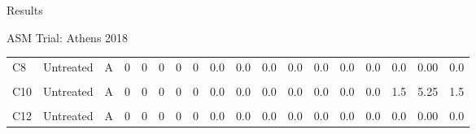 \documentclass[
  ignorenonframetext,
]{beamer}
\begin{document}
\begin{frame}{Results}
\begin{block}{ASM Trial: Athens 2018}
\begin{table}
{\begin{tabular}[t]{lllrrrrrrrrrrrrrrr}
C8 & Untreated & A & 0 & 0 & 0 & 0 & 0 & 0.0 & 0.0 & 0.0 & 0.0 & 0.0 & 0.0 & 0.0 & 0.0 & 0.00 & 0.0\\
\cellcolor{gray!6}{C9} & \cellcolor{gray!6}{Untreated} & \cellcolor{gray!6}{A} & \cellcolor{gray!6}{0} & \cellcolor{gray!6}{0} & \cellcolor{gray!6}{0} & \cellcolor{gray!6}{0} & \cellcolor{gray!6}{0} & \cellcolor{gray!6}{0.0} & \cellcolor{gray!6}{0.0} & \cellcolor{gray!6}{0.0} & \cellcolor{gray!6}{0.0} & \cellcolor{gray!6}{0.0} & \cellcolor{gray!6}{0.0} & \cellcolor{gray!6}{0.0} & \cellcolor{gray!6}{0.0} & \cellcolor{gray!6}{0.00} & \cellcolor{gray!6}{0.0}\\
\addlinespace
C10 & Untreated & A & 0 & 0 & 0 & 0 & 0 & 0.0 & 0.0 & 0.0 & 0.0 & 0.0 & 0.0 & 0.0 & 1.5 & 5.25 & 1.5\\
\cellcolor{gray!6}{C11} & \cellcolor{gray!6}{Untreated} & \cellcolor{gray!6}{A} & \cellcolor{gray!6}{0} & \cellcolor{gray!6}{0} & \cellcolor{gray!6}{0} & \cellcolor{gray!6}{0} & \cellcolor{gray!6}{0} & \cellcolor{gray!6}{0.0} & \cellcolor{gray!6}{0.0} & \cellcolor{gray!6}{0.0} & \cellcolor{gray!6}{0.0} & \cellcolor{gray!6}{0.0} & \cellcolor{gray!6}{0.0} & \cellcolor{gray!6}{0.0} & \cellcolor{gray!6}{0.0} & \cellcolor{gray!6}{0.00} & \cellcolor{gray!6}{0.0}\\
C12 & Untreated & A & 0 & 0 & 0 & 0 & 0 & 0.0 & 0.0 & 0.0 & 0.0 & 0.0 & 0.0 & 0.0 & 0.0 & 0.00 & 0.0\\
\bottomrule
\end{tabular}}
\end{table}
\end{block}


\end{frame}
\end{document}
